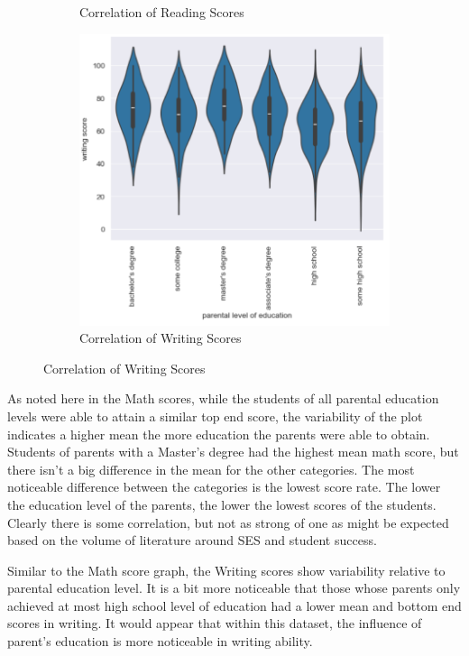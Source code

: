 \documentclass[fleqn,10pt]{olplainarticle}
\begin{document}
\begin{figure}[h!]
\begin{subfigure}{0.3\textwidth}
    \caption{Correlation of Reading Scores}
    \label{fig:1.b}
    \end{subfigure}
    \begin{subfigure}{0.3\textwidth}
    \includegraphics[width=\linewidth]{WritingVsParent.png}
    \caption{Correlation of Writing Scores}
    \label{fig:1.c}
    \end{subfigure}
\end{figure}

As noted here in the Math scores, while the students of all parental education levels were able to attain a similar top end score, the variability of the plot indicates a higher mean the more education the parents were able to obtain.  Students of parents with a Master's degree had the highest mean math score, but there isn't a big difference in the mean for the other categories.  The most noticeable difference between the categories is the lowest score rate. The lower the education level of the parents, the lower the lowest scores of the students.  Clearly there is some correlation, but not as strong of one as might be expected based on the volume of literature around SES and student success.

Similar to the Math score graph, the Writing scores show variability relative to parental education level.  It is a bit more noticeable that those whose parents only achieved at most high school level of education had a lower mean and bottom end scores in writing. It would appear that within this dataset, the influence of parent's education is more noticeable in writing ability.
\end{document}
